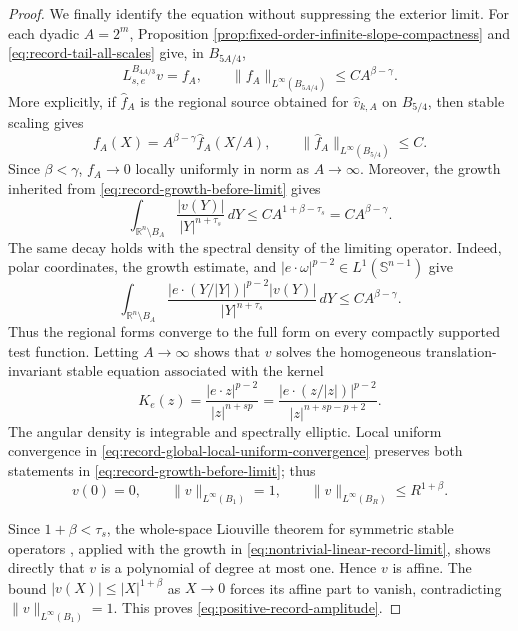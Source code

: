 \documentclass[11pt,reqno]{amsart}
\numberwithin{equation}{section}
\newcommand{\R}{\mathbb R}
\newcommand{\dd}{\,d}
\theoremstyle{remark}
\begin{document}
\begin{proof}
We finally identify the equation without suppressing the exterior
limit.  For each dyadic \(A=2^m\), Proposition
\ref{prop:fixed-order-infinite-slope-compactness} and
\eqref{eq:record-tail-all-scales} give, in \(B_{5A/4}\),
\[
 L^{B_{4A/3}}_{s,e}v=f_A,
 \qquad
 \|f_A\|_{L^\infty(B_{5A/4})}
 \le CA^{\beta-\gamma}.
\]
More explicitly, if \(\widehat f_A\) is the regional source obtained
for \(\widehat v_{k,A}\) on \(B_{5/4}\), then stable scaling gives
\[
 f_A(X)=A^{\beta-\gamma}\widehat f_A(X/A),
 \qquad \|\widehat f_A\|_{L^\infty(B_{5/4})}\le C.
\]
Since \(\beta<\gamma\), \(f_A\to0\) locally uniformly in norm as
\(A\to\infty\).  Moreover, the growth inherited from
\eqref{eq:record-growth-before-limit} gives
\begin{equation}
 \int_{\R^n\setminus B_A}
 \frac{|v(Y)|}{|Y|^{n+\tau_s}}\dd Y
 \le CA^{1+\beta-\tau_s}
 =CA^{\beta-\gamma}.
 \label{eq:record-limit-stable-tail}
\end{equation}
The same decay holds with the spectral density of the limiting
operator.  Indeed, polar coordinates, the growth estimate, and
\(|e\cdot\omega|^{p-2}\in L^1(\mathbb S^{n-1})\) give
\begin{equation*}
 \int_{\R^n\setminus B_A}
 \frac{|e\cdot(Y/|Y|)|^{p-2}|v(Y)|}
 {|Y|^{n+\tau_s}}\dd Y
 \le CA^{\beta-\gamma}.
\end{equation*}
Thus the regional forms converge to the full form on every compactly
supported test function.  Letting \(A\to\infty\) shows that \(v\)
solves the homogeneous translation-invariant stable equation associated
with the kernel
\begin{equation*}
 K_e(z)=\frac{|e\cdot z|^{p-2}}
 {|z|^{n+sp}}
 =\frac{|e\cdot(z/|z|)|^{p-2}}
 {|z|^{n+sp-p+2}}.
\end{equation*}
The angular density is integrable and spectrally elliptic.  Local
uniform convergence in
\eqref{eq:record-global-local-uniform-convergence} preserves both
statements in \eqref{eq:record-growth-before-limit}; thus
\begin{equation}
 v(0)=0,\qquad
 \|v\|_{L^\infty(B_1)}=1,\qquad
 \|v\|_{L^\infty(B_R)}\le R^{1+\beta}.
 \label{eq:nontrivial-linear-record-limit}
\end{equation}

Since \(1+\beta<\tau_s\), the whole-space Liouville theorem for
symmetric stable operators
\cite[Theorem~2.1]{RosOtonSerraStable}, applied with the growth in
\eqref{eq:nontrivial-linear-record-limit}, shows directly that \(v\)
is a polynomial of degree at most one.  Hence \(v\) is affine.  The
bound $|v(X)|\le|X|^{1+\beta}$ as $X\to0$ forces its affine part to
vanish, contradicting
$\|v\|_{L^\infty(B_1)}=1$.  This proves
\eqref{eq:positive-record-amplitude}.


\end{proof}
\end{document}
